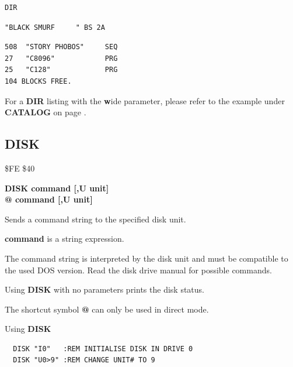 \begin{description}[leftmargin=2cm,style=nextline]
\begin{tcolorbox}[colback=black,coltext=white]
\verbatimfont{\codefont}
\begin{verbatim}
DIR
\end{verbatim}
\selectfont{\codefont 0}
\begin{tcolorbox}[colback=white,coltext=black,arc=0mm,boxrule=0mm,
       left*=0.5mm,right*=0mm,top=0mm,bottom=0mm,nobeforeafter,
       left skip=0.5mm,
       width=28mm,height=3mm,valign=center]
\begin{verbatim}
"BLACK SMURF     " BS 2A
\end{verbatim}
\end{tcolorbox}
\begin{verbatim}
508  "STORY PHOBOS"     SEQ
27   "C8096"            PRG
25   "C128"             PRG
104 BLOCKS FREE.
\end{verbatim}
\end{tcolorbox}

For a {\bf DIR} listing with the {\bf w}ide parameter, please refer to the example under {\bf CATALOG}
on page \pageref{3columndirlisting}.

\end{description}


\newpage
\subsection{DISK}
\begin{description}[leftmargin=2cm,style=nextline]
\item [Token:] \$FE \$40
\item [Format:] {\bf DISK command [,U unit] } \\
		{\bf @ command [,U unit] }
\item [Usage:]

   Sends a command string to the specified disk unit.

   \unitdefinition

   {\bf command} is a string expression.

\item [Remarks:]
   The command string is interpreted by the disk unit
   and must be compatible to the used DOS version.
   Read the disk drive manual for possible commands.

   Using {\bf DISK} with no parameters prints the disk status.

   The shortcut symbol {\bf @} can only be used in direct mode.

\item [Examples:] Using {\bf DISK}
\begin{tcolorbox}[colback=black,coltext=white]
\verbatimfont{\codefont}
\begin{verbatim}
  DISK "I0"   :REM INITIALISE DISK IN DRIVE 0
  DISK "U0>9" :REM CHANGE UNIT# TO 9
\end{verbatim}
\end{tcolorbox}
\end{description}

